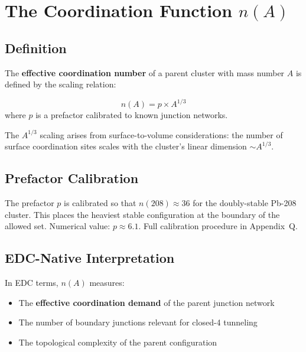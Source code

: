 \section{The Coordination Function $n(A)$}
\label{sec:frustrated:nA}

\subsection{Definition}

The \textbf{effective coordination number} of a parent cluster with mass number
$A$ is defined by the scaling relation:

\begin{derivationbox}
    \begin{equation}
        n(A) = p \times A^{1/3}
        \label{eq:f:nA}
    \end{equation}
    where $p$ is a prefactor calibrated to known junction networks.
    \tagCal
\end{derivationbox}

The $A^{1/3}$ scaling arises from surface-to-volume considerations: the
number of surface coordination sites scales with the cluster's linear
dimension $\sim A^{1/3}$.

\subsection{Prefactor Calibration}

\begin{quarantinebox}[title=Appendix Q: Prefactor Calibration]
    The prefactor $p$ is calibrated so that $n(208) \approx 36$ for the
    doubly-stable Pb-208 cluster. This places the heaviest stable
    configuration at the boundary of the allowed set.
    Numerical value: $p \approx 6.1$. Full calibration procedure in Appendix~Q.
\end{quarantinebox}

\subsection{EDC-Native Interpretation}

In EDC terms, $n(A)$ measures:
\begin{itemize}
    \item The \textbf{effective coordination demand} of the parent junction network
    \item The number of boundary junctions relevant for closed-4 tunneling
    \item The topological complexity of the parent configuration
\end{itemize}

